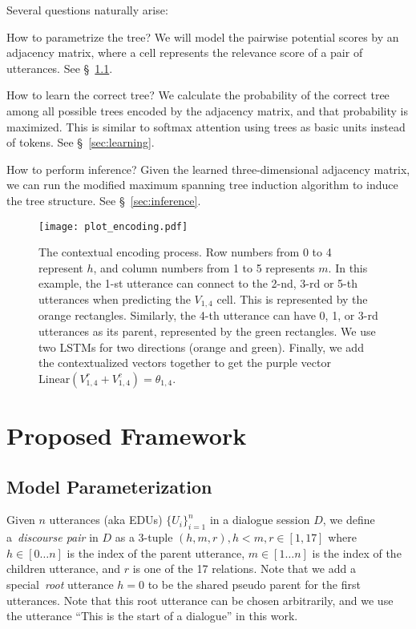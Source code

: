 \documentclass[11pt]{article}
\begin{document}
Several questions naturally arise:
\begin{compactitem}
    \item How to parametrize the tree? We will model the pairwise potential scores by an adjacency matrix, where a cell represents the relevance score of a pair of utterances. See \S~\ref{sec:parameterization}.
    \item How to learn the correct tree? We calculate the probability of the correct tree among all possible trees encoded by the adjacency matrix, and that probability is maximized. This is similar to softmax attention using trees as basic units instead of tokens. See \S~\ref{sec:learning}.
    \item How to perform inference? Given the learned three-dimensional adjacency matrix, we can run the modified maximum spanning tree induction algorithm to induce the tree structure. See \S~\ref{sec:inference}.
\end{compactitem}

\begin{figure*}[]
\vspace{-1cm}
\texttt{[image: plot\_encoding.pdf]}
\caption{The contextual encoding process. Row numbers from 0 to 4 represent $h$, and column numbers from 1 to 5 represents $m$. In this example, the 1-st utterance can connect to the 2-nd, 3-rd or 5-th utterances when predicting the $V_{1,4}$ cell. This is represented by the orange rectangles. Similarly, the 4-th utterance can have 0, 1, or 3-rd utterances as its parent, represented by the green rectangles. We use two LSTMs for two directions (orange and green). Finally, we add the contextualized vectors together to get the purple vector $\textrm{Linear}(V^r_{1,4}+V^c_{1,4})=\theta_{1,4}$.}
\label{fig:contextual_encoding}
\end{figure*}

\section{Proposed Framework}
\label{sec:framework}
\subsection{Model Parameterization}
\label{sec:parameterization}
Given $n$ utterances (aka EDUs) $\{U_i\}_{i=1}^n$ in a dialogue session $D$, we define a~\emph{discourse pair} in $D$ as a 3-tuple $(h,m,r),h < m, r\in [1,17]$ where $h\in [0\dots n]$ is the index of the parent utterance, $m\in [1 \dots n]$ is the index of the children utterance, and $r$ is one of the 17 relations. Note that we add a special~\emph{root} utterance $h=0$ to be the shared pseudo parent for the first utterances. Note that this root utterance can be chosen arbitrarily, and we use the utterance ``This is the start of a dialogue'' in this work.
\end{document}
